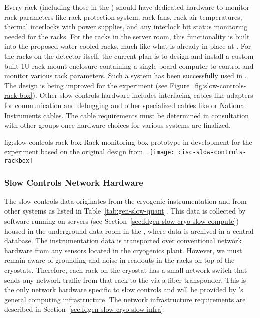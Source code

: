 Every rack (including those in the ) should have dedicated hardware to monitor rack parameters like rack protection system, rack fans, rack air temperatures, thermal interlocks with power supplies, and any interlock bit status monitoring needed for the racks. For the racks in the  server room, this functionality is built into the proposed water cooled racks, much like what is already in place at .  For the racks on the detector itself, the current plan is to design and install a custom-built 1U rack-mount enclosure containing a single-board computer to control and monitor various rack parameters. Such a system has been successfully used in . The design is being improved for the  experiment (see Figure~\ref{fig:slow-controls-rack-box}). Other slow controls hardware includes interfacing cables like adapters for communication and debugging and other specialized cables like  
or National Instruments cables. The cable requirements must be determined in consultation with other groups once hardware choices for various systems are finalized.

\begin{dunefigure}{fig:slow-controls-rack-box}
{Rack monitoring box prototype in development for the  experiment based on the original design from .}
\texttt{[image: cisc-slow-controls-rackbox]}
\end{dunefigure}


\subsubsection{Slow Controls Network Hardware}
\label{sec:fdgen-slow-cryo-slow-network}
The slow controls data originates from the cryogenic instrumentation and from other systems as listed in Table~\ref{tab:gen-slow-quant}. This data is collected by software running on servers
(see Section~\ref{sec:fdgen-slow-cryo-slow-compute})
housed in the underground data room in the ,
where data is archived in a central  database.
The instrumentation data is transported over
conventional network hardware from any sensors located in the cryogenics
plant.  However, we must remain aware of grounding and noise in readouts in the racks on top of the
cryostats.  Therefore, each
rack on the cryostat has a small network switch that sends
any network traffic from that rack to the  via a fiber transponder.
This is the only network hardware specific to slow controls and will be provided by %
's   
general computing infrastructure. %
The network infrastructure requirements are described in
Section~\ref{sec:fdgen-slow-cryo-slow-infra}.

